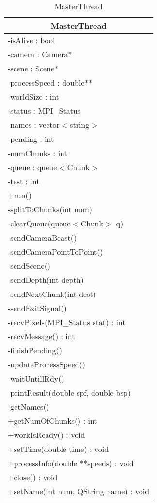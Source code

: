 \footnotesize
\begin{longtable}{|p{14cm}|}
    \caption{MasterThread} \label{tab:MasterThread} \\ \hline
    \multicolumn{1}{|c|}{MasterThread} \\ \hline
    -isAlive : bool \\
    -camera : Camera* \\
    -scene : Scene* \\
    -processSpeed : double** \\
    -worldSize : int \\
    -status : MPI\_Status \\
    -names : vector$<$string$>$ \\
    -pending : int \\
    -numChunks : int \\
    -queue : queue$<$Chunk$>$ \\
    -test : int \\
    \hline
	+run() \\
	-splitToChunks(int num) \\
	-clearQueue(queue$<$Chunk$>$ q) \\
    -sendCameraBcast() \\
    -sendCameraPointToPoint() \\
    -sendScene() \\
    -sendDepth(int depth) \\
    -sendNextChunk(int dest) \\
    -sendExitSignal() \\
    -recvPixels(MPI\_Status stat) : int \\
    -recvMessage() : int \\
    -finishPending() \\
    -updateProcessSpeed() \\
    -waitUntillRdy() \\
    -printResult(double spf, double bsp) \\
    -getNames() \\
    +getNumOfChunks() : int \\
    +workIsReady() : void \\
    +setTime(double time) : void \\
    +processInfo(double **speeds) : void \\
    +close() : void \\
    +setName(int num, QString name) : void \\
	\hline
\end{longtable}
\normalsize

